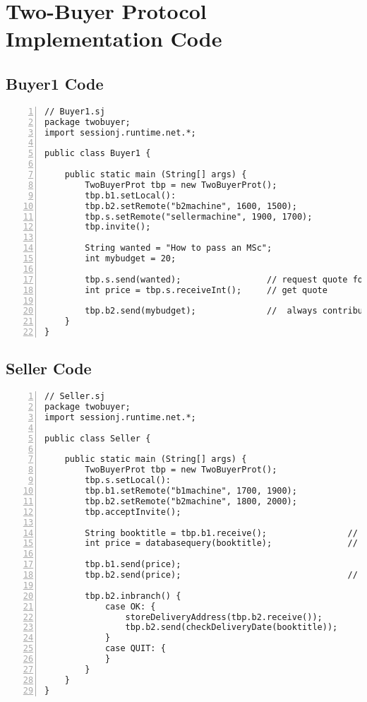 \appendix
\addappheadtotoc


\chapter{Two-Buyer Protocol Implementation Code}
\label{appendixA}

\section*{Buyer1 Code}

\begin{lstlisting}[basicstyle=\LISTINGSTYLE, numbers=left]
// Buyer1.sj
package twobuyer; 
import sessionj.runtime.net.*;
 
public class Buyer1 {
	
	public static main (String[] args) {
		TwoBuyerProt tbp = new TwoBuyerProt();
		tbp.b1.setLocal():
		tbp.b2.setRemote("b2machine", 1600, 1500);
		tbp.s.setRemote("sellermachine", 1900, 1700);
		tbp.invite();
		
		String wanted = "How to pass an MSc";
		int mybudget = 20;
		
		tbp.s.send(wanted); 				// request quote for wanted book
		int price = tbp.s.receiveInt();		// get quote
			
		tbp.b2.send(mybudget);				//	always contribute with entire budget			
	} 
}
\end{lstlisting}


\section*{Seller Code}

\begin{lstlisting}[basicstyle=\LISTINGSTYLE, numbers=left]
// Seller.sj
package twobuyer; 
import sessionj.runtime.net.*;
 
public class Seller {
	
	public static main (String[] args) {
		TwoBuyerProt tbp = new TwoBuyerProt();
		tbp.s.setLocal():
		tbp.b1.setRemote("b1machine", 1700, 1900);
		tbp.b2.setRemote("b2machine", 1800, 2000);
		tbp.acceptInvite();
		
		String booktitle = tbp.b1.receive(); 				// request quote for wanted book
		int price = databasequery(booktitle);				// query own database for price 
				
		tbp.b1.send(price);	
		tbp.b2.send(price);									//	send price to both participants
					
		tbp.b2.inbranch() {
			case OK: {
				storeDeliveryAddress(tbp.b2.receive());			// store delivery address in order				
				tbp.b2.send(checkDeliveryDate(booktitle));		// check delivery date of item
			}
			case QUIT: {										// do nothing
			}
		}
	}							
}
\end{lstlisting}